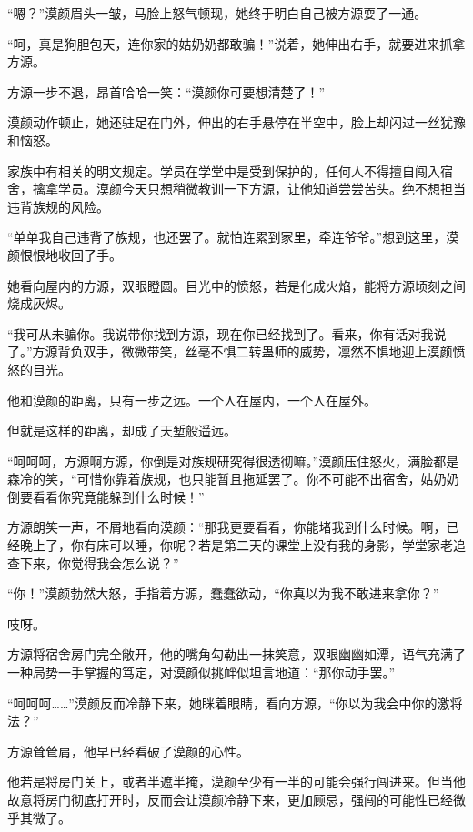 
\begin{this_body}



“嗯？”漠颜眉头一皱，马脸上怒气顿现，她终于明白自己被方源耍了一通。

“呵，真是狗胆包天，连你家的姑奶奶都敢骗！”说着，她伸出右手，就要进来抓拿方源。

方源一步不退，昂首哈哈一笑：“漠颜你可要想清楚了！”

漠颜动作顿止，她还驻足在门外，伸出的右手悬停在半空中，脸上却闪过一丝犹豫和恼怒。

家族中有相关的明文规定。学员在学堂中是受到保护的，任何人不得擅自闯入宿舍，擒拿学员。漠颜今天只想稍微教训一下方源，让他知道尝尝苦头。绝不想担当违背族规的风险。

“单单我自己违背了族规，也还罢了。就怕连累到家里，牵连爷爷。”想到这里，漠颜恨恨地收回了手。

她看向屋内的方源，双眼瞪圆。目光中的愤怒，若是化成火焰，能将方源顷刻之间烧成灰烬。

“我可从未骗你。我说带你找到方源，现在你已经找到了。看来，你有话对我说了。”方源背负双手，微微带笑，丝毫不惧二转蛊师的威势，凛然不惧地迎上漠颜愤怒的目光。

他和漠颜的距离，只有一步之远。一个人在屋内，一个人在屋外。

但就是这样的距离，却成了天堑般遥远。

“呵呵呵，方源啊方源，你倒是对族规研究得很透彻嘛。”漠颜压住怒火，满脸都是森冷的笑，“可惜你靠着族规，也只能暂且拖延罢了。你不可能不出宿舍，姑奶奶倒要看看你究竟能躲到什么时候！”

方源朗笑一声，不屑地看向漠颜：“那我更要看看，你能堵我到什么时候。啊，已经晚上了，你有床可以睡，你呢？若是第二天的课堂上没有我的身影，学堂家老追查下来，你觉得我会怎么说？”

“你！”漠颜勃然大怒，手指着方源，蠢蠢欲动，“你真以为我不敢进来拿你？”

吱呀。

方源将宿舍房门完全敞开，他的嘴角勾勒出一抹笑意，双眼幽幽如潭，语气充满了一种局势一手掌握的笃定，对漠颜似挑衅似坦言地道：“那你动手罢。”

“呵呵呵……”漠颜反而冷静下来，她眯着眼睛，看向方源，“你以为我会中你的激将法？”

方源耸耸肩，他早已经看破了漠颜的心性。

他若是将房门关上，或者半遮半掩，漠颜至少有一半的可能会强行闯进来。但当他故意将房门彻底打开时，反而会让漠颜冷静下来，更加顾忌，强闯的可能性已经微乎其微了。


\end{this_body}
